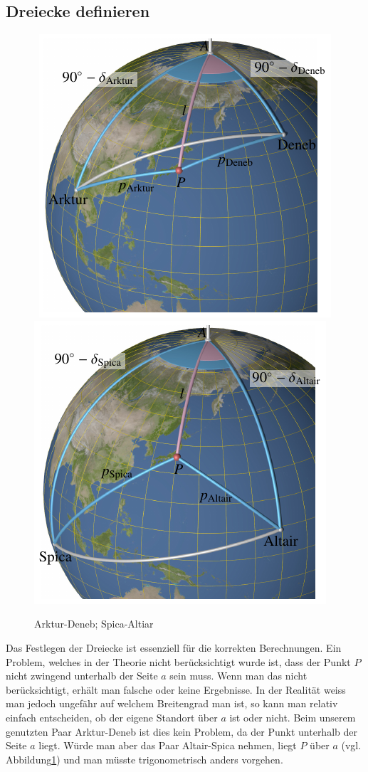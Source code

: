 \subsection{Dreiecke definieren}
\begin{figure} 
\hbox{%
\includegraphics{papers/nav/images/beispiele/beispiele1.pdf}%
\hfill%
\includegraphics{papers/nav/images/beispiele/beispiele2.pdf}}
\caption{Arktur-Deneb; Spica-Altiar
\label{nav:beispiele}}
\end{figure}
Das Festlegen der Dreiecke ist essenziell für die korrekten Berechnungen.
Ein Problem, welches in der Theorie nicht berücksichtigt wurde ist, dass der Punkt $P$ nicht zwingend unterhalb der Seite $a$ sein muss. 
Wenn man das nicht berücksichtigt, erhält man falsche oder keine Ergebnisse. 
In der Realität weiss man jedoch ungefähr auf welchem Breitengrad man ist, so kann man relativ einfach entscheiden, ob der eigene Standort über $a$ ist oder nicht.
Beim unserem genutzten Paar Arktur-Deneb ist dies kein Problem, da der Punkt unterhalb der Seite $a$ liegt. 
Würde man aber das Paar Altair-Spica nehmen, liegt $P$ über $a$
(vgl. Abbildung\ref{nav:beispiele}) und man müsste trigonometrisch
anders vorgehen. 

